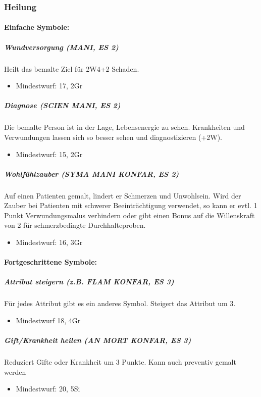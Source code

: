 \documentclass{article}
\begin{document}
\subsubsection{Heilung}

\paragraph{Einfache Symbole:}

\subparagraph{Wundversorgung (MANI, ES 2)}
Heilt das bemalte Ziel für 2W4+2 Schaden.
\begin{itemize}
\item Mindestwurf: 17, 2Gr
\end{itemize}

\subparagraph{Diagnose (SCIEN MANI, ES 2)}
Die bemalte Person ist in der Lage, Lebensenergie zu sehen. Krankheiten und Verwundungen lassen sich so besser sehen und diagnostizieren (+2W).
\begin{itemize}
\item Mindestwurf: 15, 2Gr
\end{itemize}

\subparagraph{Wohlfühlzauber (SYMA MANI KONFAR, ES 2)}
Auf einen Patienten gemalt, lindert er Schmerzen und Unwohlsein. Wird der Zauber bei Patienten mit schwerer Beeinträchtigung verwendet, so kann er evtl. 1 Punkt Verwundungsmalus verhindern oder gibt einen Bonus auf die Willenskraft von 2 für schmerzbedingte Durchhalteproben.
\begin{itemize}
\item Mindestwurf: 16, 3Gr
\end{itemize}

\paragraph{Fortgeschrittene Symbole:}

\subparagraph{Attribut steigern (z.B. FLAM KONFAR, ES 3)}
Für jedes Attribut gibt es ein anderes Symbol. Steigert das Attribut um 3.
\begin{itemize}
\item Mindestwurf 18, 4Gr
\end{itemize}

\subparagraph{Gift/Krankheit heilen (AN MORT KONFAR, ES 3)}
Reduziert Gifte oder Krankheit um 3 Punkte. Kann auch preventiv gemalt werden
\begin{itemize}
\item Mindestwurf: 20, 5Si
\end{itemize}
\end{document}
